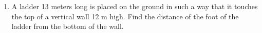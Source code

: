 \begin{enumerate}
\item A ladder 13 meters long is placed on the ground in such a way that it touches the top of a vertical wall 12 m high. Find the distance of the foot of the ladder from the bottom of the wall.
\begin{flushright}
\end{flushright}

\end{enumerate}
